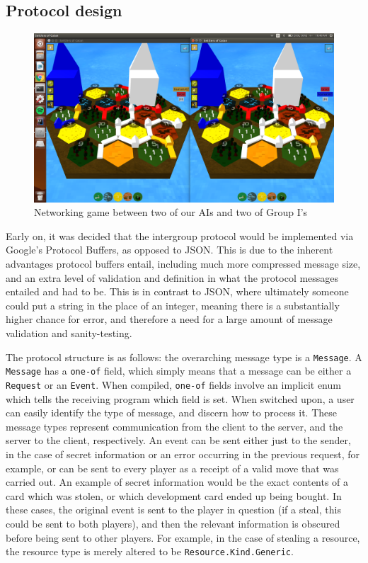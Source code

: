 \documentclass[a4paper,doc]{apa6}
\newcommand{\code}{\texttt}
\begin{document}
\subsection{Protocol design}
\begin{figure}[hbtp]
      \includegraphics[width=\textwidth]{finishedAIGame}
      \caption{Networking game between two of our AIs and two of Group I's}
\end{figure}
Early on, it was decided that the intergroup protocol would be implemented via Google’s Protocol Buffers, as opposed to JSON. This is due to the inherent advantages protocol buffers entail, including much more compressed message size, and an extra level of validation and definition in what the protocol messages entailed and had to be. This is in contrast to JSON, where ultimately someone could put a string in the place of an integer, meaning there is a substantially higher chance for error, and therefore a need for a large amount of message validation and sanity-testing.

The protocol structure is as follows: the overarching message type is a \code{Message}. A \code{Message} has a \code{one-of} field, which simply means that a message can be either a \code{Request} or an \code{Event}. When compiled, \code{one-of} fields involve an implicit enum which tells the receiving program which field is set. When switched upon, a user can easily identify the type of message, and discern how to process it. These message types represent communication from the client to the server, and the server to the client, respectively. An event can be sent either just to the sender, in the case of secret information or an error occurring in the previous request, for example, or can be sent to every player as a receipt of a valid move that was carried out. An example of secret information would be the exact contents of a card which was stolen, or which development card ended up being bought. In these cases, the original event is sent to the player in question (if a steal, this could be sent to both players), and then the relevant information is obscured before being sent to other players. For example, in the case of stealing a resource, the resource type is merely altered to be \code{Resource.Kind.Generic}.
\end{document}
